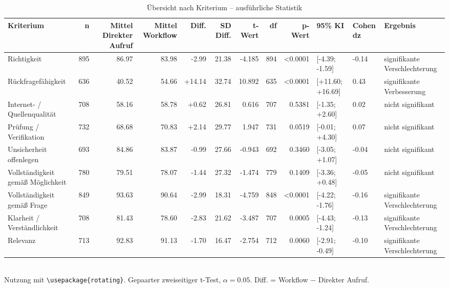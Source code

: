 \begin{table}
\centering
\caption{Übersicht nach Kriterium -- ausführliche Statistik}
\begin{tabular}{lrrrrrrrrlll}
\toprule
Kriterium & n & Mittel Direkter Aufruf & Mittel Workflow & Diff. & SD Diff. & t-Wert & df & p-Wert & 95\% KI & Cohen dz & Ergebnis \\
\midrule
Richtigkeit & 895 & 86.97 & 83.98 & -2.99 & 21.38 & -4.185 & 894 & <0.0001 & [-4.39; -1.59] & -0.14 & signifikante Verschlechterung \\
Rückfragefähigkeit & 636 & 40.52 & 54.66 & +14.14 & 32.74 & 10.892 & 635 & <0.0001 & [+11.60; +16.69] & 0.43 & signifikante Verbesserung \\
Internet- / Quellenqualität & 708 & 58.16 & 58.78 & +0.62 & 26.81 & 0.616 & 707 & 0.5381 & [-1.35; +2.60] & 0.02 & nicht signifikant \\
Prüfung / Verifikation & 732 & 68.68 & 70.83 & +2.14 & 29.77 & 1.947 & 731 & 0.0519 & [-0.01; +4.30] & 0.07 & nicht signifikant \\
Unsicherheit offenlegen & 693 & 84.86 & 83.87 & -0.99 & 27.66 & -0.943 & 692 & 0.3460 & [-3.05; +1.07] & -0.04 & nicht signifikant \\
Vollständigkeit gemäß Möglichkeit & 780 & 79.51 & 78.07 & -1.44 & 27.32 & -1.474 & 779 & 0.1409 & [-3.36; +0.48] & -0.05 & nicht signifikant \\
Vollständigkeit gemäß Frage & 849 & 93.63 & 90.64 & -2.99 & 18.31 & -4.759 & 848 & <0.0001 & [-4.22; -1.76] & -0.16 & signifikante Verschlechterung \\
Klarheit / Verständlichkeit & 708 & 81.43 & 78.60 & -2.83 & 21.62 & -3.487 & 707 & 0.0005 & [-4.43; -1.24] & -0.13 & signifikante Verschlechterung \\
Relevanz & 713 & 92.83 & 91.13 & -1.70 & 16.47 & -2.754 & 712 & 0.0060 & [-2.91; -0.49] & -0.10 & signifikante Verschlechterung \\
\bottomrule
\end{tabular}
\\[2mm]
\footnotesize Nutzung mit \texttt{\textbackslash usepackage\{rotating\}}. Gepaarter zweiseitiger t-Test, $\alpha=0.05$. Diff. = Workflow $-$ Direkter Aufruf.
\end{table}
